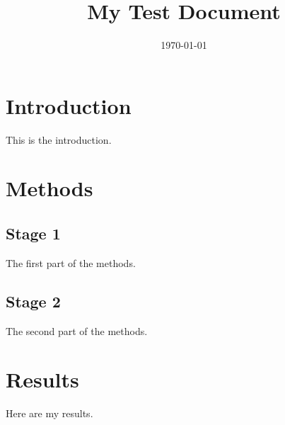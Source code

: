 \documentclass[a4paper,12pt]{report}
\begin{document}
\title{My Test Document}
\author{}
\date{\today}
\maketitle

\section{Introduction}
This is the introduction.

\section{Methods}

\subsection{Stage 1}
The first part of the methods.

\subsection{Stage 2}
The second part of the methods.

\section{Results}
Here are my results.
\end{document}
